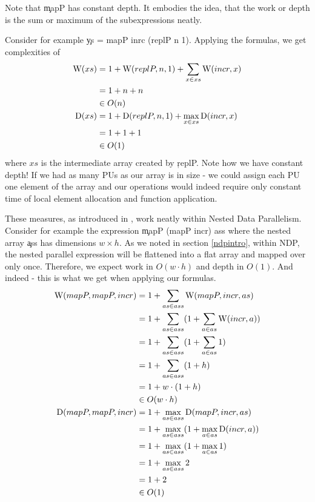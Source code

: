   Note that \c{mapP} has constant depth. 
  It embodies the idea, that the work or depth is the sum or maximum
  of the subexpressions neatly.
  
  Consider for example \c{ys = mapP inrc (replP n 1)}.
  Applying the formulas, we
  get complexities of
  \begin{equation*}
  \begin{split}
  \textrm{W}(xs)
        & = 1 + \textrm{W}(replP,n,1) + \sum_{x \in xs}\textrm{W}(incr,x) \\
        & = 1 + n + n \\
        & \in O(n) \\
  \textrm{D}(xs) & = 1 + \textrm{D}(replP,n,1) + \max_{x \in xs}\textrm{D}(incr,x) \\
      & = 1 + 1 + 1 \\
      & \in O(1) \\
  \end{split}
  \end{equation*}
  where $xs$ is the intermediate array created by \c{replP}.
  Note how we have constant depth!
  If we had as many PUs as our array is in size
  - we could assign each PU one element of the array and our operations
  would indeed require only constant time of local element allocation
  and function application.
  
  These measures, as introduced in \cite{Belloch1996}, work
  neatly within Nested Data Parallelism. Consider for example the
  expression \c{mapP (mapP incr) ass} where the
  nested array \c{ass} has dimensions $w \times h$.
  As we noted in section \ref{ndpintro}, within NDP,
  the nested parallel expression will be flattened into a
  flat array and mapped over only once. Therefore, we expect
  work in $O(w \cdot h)$ and depth in $O(1)$. And indeed - 
  this is what we get when applying our formulas.
  \begin{equation*}
  \begin{split}
  \textrm{W}(mapP,mapP,incr)
        & = 1 + \sum_{as \in ass}\textrm{W}(mapP,incr,as) \\
        & = 1 + \sum_{as \in ass}(1 + \sum_{a \in as} \textrm{W}(incr,a)) \\
        & = 1 + \sum_{as \in ass}(1 + \sum_{a \in as} 1) \\
        & = 1 + \sum_{as \in ass}(1 + h) \\
        & = 1 + w \cdot (1 + h) \\
        & \in O(w \cdot h) \\
  \textrm{D}(mapP,mapP,incr) & = 1 + \max_{as \in ass}\textrm{D}(mapP,incr,as) \\
        & = 1 + \max_{as \in ass}(1 + \max_{a \in as} \textrm{D}(incr,a)) \\
        & = 1 + \max_{as \in ass}(1 + \max_{a \in as} 1) \\
        & = 1 + \max_{as \in ass}2 \\
        & = 1 + 2 \\
        & \in O(1) \\
  \end{split}
  \end{equation*}
  
